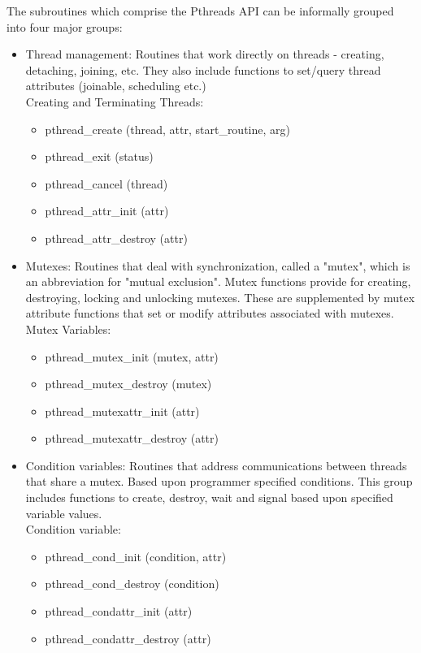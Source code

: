The subroutines which comprise the Pthreads API can be informally grouped into four major groups:
\begin{itemize}
\item Thread management: Routines that work directly on threads - creating, detaching, joining, etc. They also include functions to set/query thread attributes (joinable, scheduling etc.)
\\Creating and Terminating Threads:
\begin{itemize}
\item pthread\_create (thread, attr, start\_routine, arg)
\item pthread\_exit (status)
\item pthread\_cancel (thread)
\item pthread\_attr\_init (attr)
\item pthread\_attr\_destroy (attr)
\end{itemize}

\item Mutexes: Routines that deal with synchronization, called a "mutex", which is an abbreviation for "mutual exclusion". Mutex functions provide for creating, destroying, locking and unlocking mutexes. These are supplemented by mutex attribute functions that set or modify attributes associated with mutexes.
\\Mutex Variables:
\begin{itemize}
\item pthread\_mutex\_init (mutex, attr)
\item pthread\_mutex\_destroy (mutex)
\item pthread\_mutexattr\_init (attr)
\item pthread\_mutexattr\_destroy (attr)
\end{itemize} 

\item Condition variables: Routines that address communications between threads that share a mutex. Based upon programmer specified conditions. This group includes functions to create, destroy, wait and signal based upon specified variable values. 
\\Condition variable:
\begin{itemize}
\item pthread\_cond\_init (condition, attr)
\item pthread\_cond\_destroy (condition)
\item pthread\_condattr\_init (attr)
\item pthread\_condattr\_destroy (attr)
\end{itemize}


\end{itemize}
